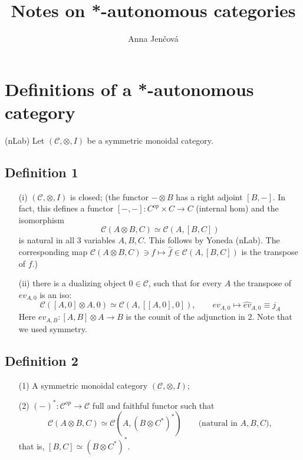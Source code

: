 \documentclass[12pt]{article}
\title{Notes on *-autonomous categories}
\author{Anna Jen\v cov\'a}
\theoremstyle{definition}
\theoremstyle{remark}
\def\Ce{\mathcal C}
\begin{document}
\maketitle


\section{Definitions of a *-autonomous category}


(nLab)
Let $(\Ce,\otimes,I)$ be a symmetric monoidal category.

\subsection{Definition 1}

\begin{enumerate}
\item[(i)] $(\Ce,\otimes, I)$ is closed; (the functor $-\otimes B$ has a right adjoint $[B,-]$. In fact, this defines a
functor  $[-,-]: C^{op}\times C\to C$ (internal hom) and the  isomorphism
\[
\Ce(A\otimes B,C)\simeq \Ce(A,[B,C])
\]
is natural in all 3 variables $A,B,C$. This follows by  Yoneda (nLab). The corresponding
map $\Ce(A\otimes B,C)\ni f\mapsto \hat f\in \Ce(A,[B,C])$ is the transpose of $f$.)

\item[(ii)] there is a dualizing object $0\in \Ce$, such that for every $A$ the transpose of $ev_{A,0}$ is an iso:
\[
\Ce([A,0]\otimes A,0)\simeq \Ce(A, [[A,0],0]),\qquad ev_{A,0}\mapsto \hat{ev}_{A,0}\equiv j_A
\]
Here  $ev_{A,B}: [A,B]\otimes A\to B$ is  the counit of the
adjunction in 2. Note that we used symmetry.

\end{enumerate}

\subsection{Definition 2} 

\begin{enumerate}
\item[(1)] A symmetric monoidal category $(\Ce,\otimes,I)$;
\item[(2)] $(-)^*: \Ce^{op}\to \Ce$ full and faithful functor such that 
\[
\Ce(A\otimes B,C)\simeq \Ce(A,(B\otimes C^*)^*) \qquad \text{(natural in } A,B,C),
\]
that is, $[B,C]\simeq (B\otimes C^*)^*$.

\end{enumerate}
\end{document}
